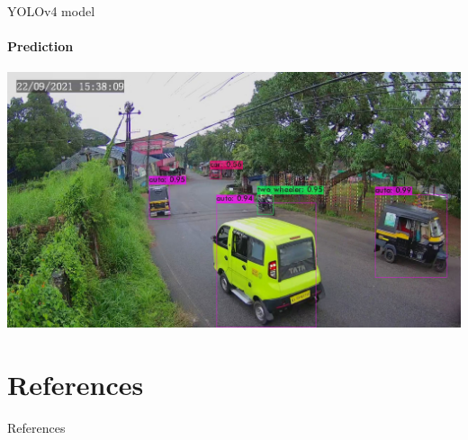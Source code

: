 \documentclass{beamer}
\begin{document}
	\begin{frame}{YOLOv4 model}
		\framesubtitle{Prediction}
		\begin{center}
			\includegraphics[width=\linewidth]{res/data_set1/predictions}
		\end{center}
	\end{frame}


\section{References}
\begin{frame}[allowframebreaks]{References}
	\nocite{*}
	
	
\end{frame}
\end{document}
